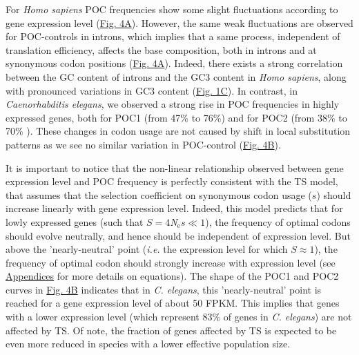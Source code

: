 For \textit{Homo sapiens} POC frequencies show some slight fluctuations according to gene expression level (\hyperref[fig:CU4]{Fig. 4A}). However, the same weak fluctuations are observed for POC-controls in introns, which implies that a same process, independent of translation efficiency, affects the base composition, both in introns and at synonymous codon positions (\hyperref[fig:CU4]{Fig. 4A}). Indeed, there exists a strong correlation between the GC content of introns and the GC3 content in \textit{Homo sapiens}, along with pronounced variations in GC3 content (\hyperref[fig:CU1]{Fig. 1C}). In contrast, in \textit{Caenorhabditis elegans}, we observed a strong rise in POC frequencies in highly expressed genes, both for POC1 (from 47\% to 76\%) and for POC2 (from 38\% to 70\% ). These changes in codon usage are not caused by shift in local substitution patterns as we see no similar variation in POC-control (\hyperref[fig:CU4]{Fig. 4B}).


It is important to notice that the non-linear relationship observed between gene expression level and POC frequency is perfectly consistent with the TS model, that assumes that the selection coefficient on synonymous codon usage ($s$) should increase linearly with gene expression level. Indeed, this model predicts that for lowly expressed genes (such that $S = 4$\textit{N}$_{\text{e}}s \ll 1$), the frequency of optimal codons should evolve neutrally, and hence should be independent of expression level. But above the 'nearly-neutral' point (\textit{i.e.} the expression level for which $S\approx1$), the frequency of optimal codon should strongly increase with expression level (see \hyperref[appendices]{Appendices} for more details on equations). The shape of the POC1 and POC2 curves in \hyperref[fig:CU4]{Fig. 4B} indicates that in \textit{C. elegans}, this 'nearly-neutral' point is reached for a gene expression level of about 50 FPKM. This implies that genes with a lower expression level (which represent 83\% of genes in \textit{C. elegans}) are not affected by TS. Of note, the fraction of genes affected by TS is expected to be even more reduced in species with a lower effective population size.


